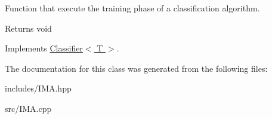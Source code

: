 Function that execute the training phase of a classification algorithm. 

\begin{DoxyReturn}{Returns}
void 
\end{DoxyReturn}


Implements \hyperlink{class_classifier_a120849bfdfa3ba7a0388b32b2d76bf4f}{Classifier$<$ T $>$}.



The documentation for this class was generated from the following files\+:\begin{DoxyCompactItemize}
\item 
includes/I\+M\+A.\+hpp\item 
src/I\+M\+A.\+cpp\end{DoxyCompactItemize}
